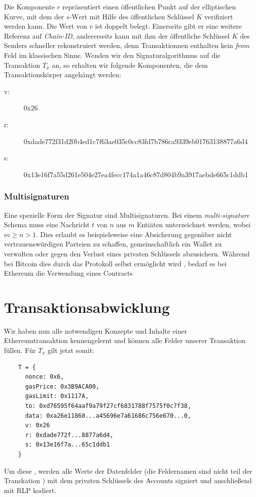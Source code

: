 \documentclass[runningheads]{llncs}
\begin{document}
Die Komponente $ r $ repräsentiert einen öffentlichen Punkt auf der elliptischen Kurve, mit dem der $ s\text{-Wert} $ mit Hilfe des öffentlichen Schlüssel $ K $ verifiziert werden kann. Die Wert von $ v $ ist doppelt belegt. Einerseits gibt er eine weitere Referenz auf \textit{Chain-ID}, andererseits kann mit ihm der öffentliche Schlüssel $ K $ des Senders schneller rekonstruiert werden, denn Transaktionnen enthalten kein \textit{from} Feld im klassischen Sinne. Wenden wir den Signaturalgorithmus auf die Transaktion $ T_x $ an, so erhalten wir folgende Komponenten, die dem Transaktionskörper angehängt werden: \cite[S. 114 ff.]{antonopoulos_mastering_2019}

\begin{description}
    \item[v:] 0x26
    \item [r:] 0xdade772f31d20b4ed1c7f63ae035c0cc83fd7b786ca9339eb01763138877a6d4
    \item[s:] 0x13e16f7a55d261e504e27ea4fecc174a1a46c87d804b9a3917aebde665c1ddb1
\end{description}

\subsubsection{Multisignaturen}
Eine spezielle Form der Signatur sind Multisignaturen. Bei einem \textit{multi-signature} Schema muss eine Nachricht $ t $ von $ n $ aus $ m $ Entiäten unterzeichnet werden, wobei $ m \geq n > 1 $. \cite[S. 2]{hutchison_identity-based_2006} Dies erlaubt es beispielsweise eine Absicherung gegenüber nicht vertrauenswürdigen Parteien zu schaffen, gemeinschaftlich ein Wallet zu verwalten oder gegen den Verlust eines privaten Schlüssels abzusichern. Während bei Bitcoin dies durch das Protokoll selbst ermöglicht wird \cite{noauthor_multisignature_nodate}, bedarf es bei Ethereum die Verwendung eines Contracts \cite{noauthor_frequently_nodate}


\section{Transaktionsabwicklung}
Wir haben nun alle notwendigen Konzepte und Inhalte einer Ethereumtransaktion kennengelernt und können alle Felder unserer Transaktion füllen. Für $T_x$ gilt jetzt somit:
\begin{center}
  \begin{verbatim}
    T = { 
      nonce: 0x6,
      gasPrice: 0x3B9ACA00,
      gasLimit: 0x1117A,
      to: 0xd76595f64aaf9a79f27cf6831788f7575f0c7f38,
      data: 0xa26e11860...a45696e7a61686c756e670...0,
      v: 0x26
      r: 0xdade772f...8877a6d4,
      s: 0x13e16f7a...65c1ddb1
    }
  \end{verbatim}
\end{center}
Um diese , werden alle Werte der Datenfelder (die Feldernamen sind nicht teil der Transkation \cite[S. 100]{antonopoulos_mastering_2019}) mit dem privaten Schlüssels des Accounts signiert und anschließend mit RLP kodiert.
\end{document}
